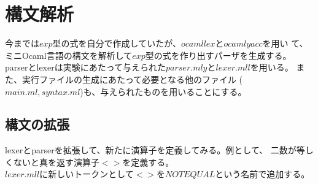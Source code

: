 \documentclass[a4paper,9pt]{jsarticle}
\begin{document}
\section{構文解析}
今までは$exp$型の式を自分で作成していたが、$ocamllex$と$ocamlyacc$を用い
て、ミニOcaml言語の構文を解析して$exp$型の式を作り出すパーザを生成する。
parserとlexerは実験にあたって与えられた$parser.mly$と$lexer.mll$を用いる。
また、実行ファイルの生成にあたって必要となる他のファイル
($main.ml,syntax.ml$)も、与えられたものを用いることにする。

\subsection{構文の拡張}
lexerとparserを拡張して、新たに演算子を定義してみる。例として、
二数が等しくないと真を返す演算子$<>$を定義する。\\

$lexer.mll$に新しいトークンとして$<>$を$NOTEQUAL$という名前で追加する。
\end{document}
